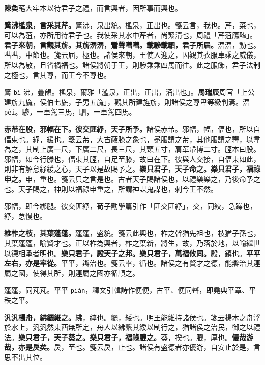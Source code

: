 \begin{quoting}\textbf{陳奐}芼大牢本以待君子之禮，而言興者，因所事而興也。\end{quoting}

\textbf{觱沸檻泉，言采其芹。}{\footnotesize 觱沸，泉出貌。檻泉，正出也。箋云言，我也。芹，菜也，可以為菹，亦所用待君子也。我使采其水中芹者，尚絜清也，周禮「芹菹鴈醢」。}\textbf{君子來朝，言觀其旂。其旂淠淠，鸞聲嘒嘒。載驂載駟，君子所屆。}{\footnotesize 淠淠，動也。嘒嘒，中節也。箋云屆，極也。諸侯來朝，王使人迎之，因觀其衣服車乘之威儀，所以為敬，且省禍福也。諸侯將朝于王，則驂乘乘四馬而往。此之服飾，君子法制之極也，言其尊，而王今不尊也。}

\begin{quoting}觱 \texttt{bì} 沸，疊韻。檻泉，爾雅「濫泉，正出，正出，涌出也」。\textbf{馬瑞辰}周官「上公建旂九旒，侯伯七旒，子男五旒」，觀其所建旌旂，則諸侯之尊卑等級判焉。淠 \texttt{pèi}。驂，一車駕三馬，駟，一車駕四馬。\end{quoting}

\textbf{赤芾在股，邪幅在下。彼交匪紓，天子所予。}{\footnotesize 諸侯赤芾。邪幅，幅，偪也，所以自偪束也。紓，緩也。箋云芾，大古蔽膝之象也，冕服謂之芾，其他服謂之韠，以韋為之，其制上廣一尺，下廣二尺，長三尺，其頸五寸，肩革帶博二寸。脛本曰股。邪幅，如今行縢也，偪束其脛，自足至膝，故曰在下。彼與人交接，自偪束如此，則非有解怠紓緩之心，天子以是故賜予之。}\textbf{樂只君子，天子命之。樂只君子，福祿申之。}{\footnotesize 申，重也。箋云只之言是也。古者天子賜諸侯也，以禮樂樂之，乃後命予之也。天子賜之，神則以福祿申重之，所謂神謀鬼謀也，刺今王不然。}

\begin{quoting}邪幅，即今綁腿。彼交匪紓，荀子勸學篇引作「匪交匪紓」，交，同絞，急躁也，紓，怠慢也。\end{quoting}

\textbf{維柞之枝，其葉蓬蓬。}{\footnotesize 蓬蓬，盛貌。箋云此興也，柞之幹猶先祖也，枝猶子孫也，其葉蓬蓬，喻賢才也。正以柞為興者，柞之葉新，將生，故，乃落於地，以喻繼世以德相承者明也。}\textbf{樂只君子，殿天子之邦。樂只君子，萬福攸同。}{\footnotesize 殿，鎮也。}\textbf{平平左右，亦是率從。}{\footnotesize 平平，辯治也。箋云率，循也。諸侯之有賢才之德，能辯治其連屬之國，使得其所，則連屬之國亦循順之。}

\begin{quoting}蓬蓬，同芃芃。平平 \texttt{pián}，釋文引韓詩作便便，古平、便同聲，即堯典平章、平秩之平。\end{quoting}

\textbf{汎汎楊舟，紼纚維之。}{\footnotesize 紼，繂也。纚，緌也。明王能維持諸侯也。箋云楊木之舟浮於水上，汎汎然東西無所定，舟人以紼繫其緌以制行之，猶諸侯之治民，御之以禮法。}\textbf{樂只君子，天子葵之。樂只君子，福祿膍之。}{\footnotesize 葵，揆也。膍，厚也。}\textbf{優哉游哉，亦是戾矣。}{\footnotesize 戾，至也。箋云戾，止也。諸侯有盛德者亦優游，自安止於是，言思不出其位。}

